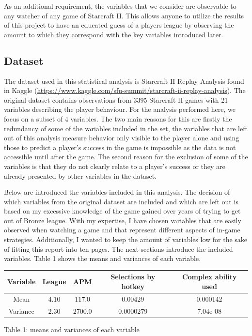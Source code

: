 \documentclass{article}
\begin{document}
As an additional requirement, the variables that we consider are observable to any watcher of any game of Starcraft II. This allows anyone to utilize the results of this project to have an educated guess of a players league by observing the amount to which they correspond with the key variables introduced later.

\subsection{Dataset}
The dataset used in this statistical analysis is Starcraft II Replay Analysis found in Kaggle (\url{https://www.kaggle.com/sfu-summit/starcraft-ii-replay-analysis}). The original dataset contains observations from 3395 Starcraft II games with 21 variables describing the player behaviour. For the analysis performed here, we focus on a subset of 4 variables. The two main reasons for this are firstly the redundancy of some of the variables included in the set, the variables that are left out of this analysis measure behavior only visible to the player alone and using those to predict a player's success in the game is impossible as the data is not accessible until after the game. The second reason for the exclusion of some of the variables is that they do not clearly relate to a player's success or they are already presented by other variables in the dataset.

Below are introduced the variables included in this analysis. The decision of which variables from the original dataset are included and which are left out is based on my excessive knowledge of the game gained over years of trying to get out of Bronze league. With my expertise, I have chosen variables that are easily observed when watching a game and that represent different aspects of in-game strategies. Additionally, I wanted to keep the amount of variables low for the sake of fitting this report into ten pages. The next sections introduce the included variables. Table 1 shows the means and variances of each variable.

\begin{center}
\begin{tabular} { | c | c | c | c | c | }
\hline
Variable & League & APM & Selections by hotkey & Complex ability used \\
\hline
Mean & 4.10 & 117.0 & 0.00429 & 0.000142 \\
\hline
Variance & 2.30 & 2700.0 & 0.0000279 & 7.04e-08 \\
\hline
\end{tabular}
\caption{Table 1: means and variances of each variable}
\label{table:1}
\end{center}
\end{document}
